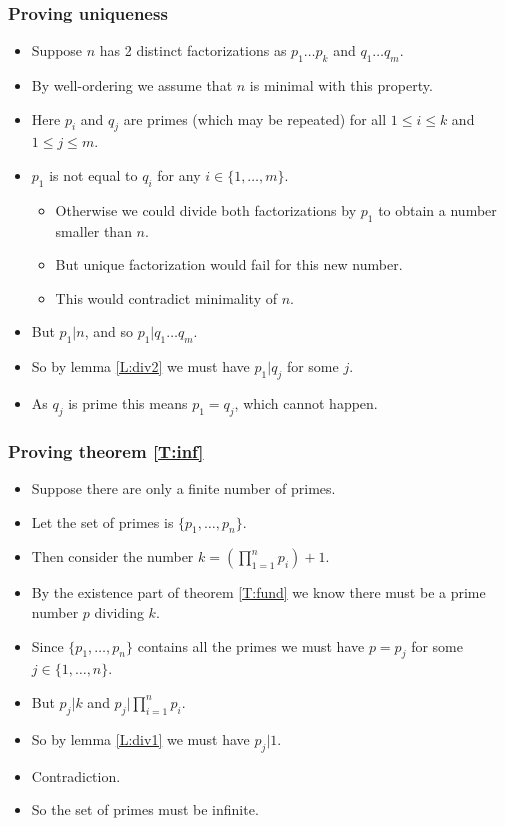 \documentclass[handout]{beamer}
\begin{document}
\begin{frame}
\frametitle{Proving uniqueness}
\begin{itemize}
\item Suppose $n$ has 2 distinct factorizations as $p_1\ldots p_k$ and $q_1\ldots q_m$. 
\item By well-ordering we assume that $n$ is minimal with this property. 
\item Here $p_i$ and $q_j$ are primes (which may be repeated) for all $1\leq i\leq k$ and $1\leq j\leq m$. 
\item $p_1$ is not equal to $q_i$ for any $i\in\{1,\ldots,m\}$.
\begin{itemize}
\item Otherwise we could divide both factorizations by $p_1$ to obtain a number smaller than $n$. 
\item But unique factorization would fail for this new number. 
\item This would contradict minimality of $n$. 
\end{itemize} 
\item But $p_1|n$, and so $p_1|q_1\ldots q_m$. 
\item So by lemma \ref{L:div2} we must have $p_1|q_j$ for some $j$. 
\item As $q_j$ is prime this means $p_1= q_j$, which cannot happen. 
\end{itemize}
\end{frame}

\begin{frame}
\frametitle{Proving theorem \ref{T:inf}}
\begin{itemize}
\item Suppose there are only a finite number of primes. 
\item Let the set of primes is $\{p_1,\ldots,p_n\}$. 
\item Then consider the number $k=(\prod_{1=1}^n p_i) +1$. 
\item By the existence part of theorem \ref{T:fund} we know there must be a prime number $p$ dividing $k$. 
\item Since $\{p_1,\ldots,p_n\}$ contains all the primes we must have $p=p_j$ for some $j\in\{1,\ldots,n\}$. 
\item But $p_j|k$ and $p_j|\prod_{i=1}^n p_i$. 
\item So by lemma \ref{L:div1} we must have $p_j|1$. 
\item Contradiction.
\item So the set of primes must be infinite.
\end{itemize}
\end{frame}
\end{document}
